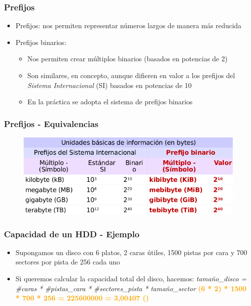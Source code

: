 \begin{frame}
  \frametitle{Prefijos}
  \begin{itemize}
    \item Prefijos: nos permiten representar números largos de manera más reducida
    \item Prefijos binarios: 
    \begin{itemize}
      \item Nos permiten crear múltiplos binarios (basados en potencias de 2)
      \item Son similares, en concepto, aunque difieren en valor a los prefijos del \emph{Sistema Internacional} (SI) basados en potencias de 10
      \item En la práctica se adopta el sistema de prefijos binarios
    \end{itemize}  
  \end{itemize}
\end{frame}

\begin{frame}
  \frametitle{Prefijos - \textbf{Equivalencias}}
  \begin{figure}
      \includegraphics[scale=0.5]{images/si.png}
  \end{figure}
\end{frame}

\begin{frame}
  \frametitle{Capacidad de un \textbf{HDD} - Ejemplo}
  \begin{itemize}
    \item Supongamos un disco con 6 platos, 2 caras útiles, 1500 pistas por cara y 700 sectores por pista de 256 \bytes \hspace{1pt} cada uno
    \item Si queremos calcular la capacidad total del disco, hacemos:
    \linebreak
    \linebreak
    \emph{tamaño\_disco = \#caras * \#pistas\_cara * \#sectores\_pista * tamaño\_sector}
    \linebreak
    \linebreak
    \textcolor{orange}{\textbf{(6 * 2) * 1500 * 700 * 256 \bytes \hspace{1pt} = 225600000 \bytes \hspace{1pt} = 3,00407 \gibishort\bytesshort (\gibi\bytes)}}
  \end{itemize}
\end{frame}


